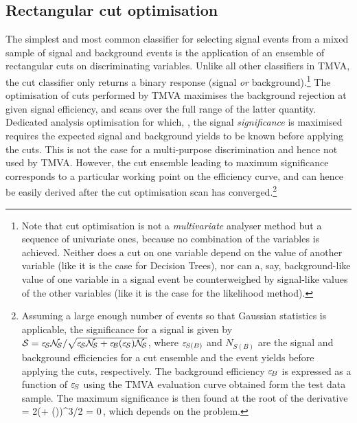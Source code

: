 \subsection{Rectangular cut optimisation}
\label{sec:cuts}

The simplest and most common classifier for selecting signal events from
a mixed sample of signal and background events is the application of an ensemble
of rectangular cuts on discriminating variables. Unlike 
all other classifiers in TMVA, the cut classifier only returns a binary 
response (signal {\em or} background).\footnote
{
   Note that cut optimisation is not a {\em multivariate} analyser 
   method but a sequence of univariate ones, because no combination of 
   the variables is achieved. Neither
   does a cut on one variable depend on the value of another variable
   (like it is the case for Decision Trees), nor can a, say, background-like
   value of one variable in a signal event be counterweighed by signal-like
   values of the other variables (like it is the case for the likelihood method).
}
The optimisation of cuts performed by TMVA maximises the background rejection
at given signal efficiency, and scans over the full range of the 
latter quantity. Dedicated analysis optimisation for which, \eg, the signal 
{\em significance} is maximised requires the expected signal and background
yields to be known before applying the cuts. This is not the case for a 
multi-purpose discrimination and hence not used by TMVA.
However, the cut ensemble leading to maximum significance corresponds to 
a particular working point on the efficiency curve, and can hence be easily
derived after the cut optimisation scan has converged.\footnote
{\label{ftn:cutcomp}
  Assuming a large enough number of events so that Gaussian statistics is applicable, the
  significance for a signal is given by $\Signif=\eS \NS/\sqrt{\eS \NS + \eB(\eS) \NS}$,
  where $\varepsilon_{\!S(B)}$ and $N_{\!S(B)}$ are the signal and background efficiencies for 
  a cut ensemble and the event yields before applying the cuts, respectively. 
  The background efficiency $ \varepsilon_{\!B}$
  is expressed as a function of $ \varepsilon_{\!S}$ using the TMVA evaluation curve obtained form 
  the test data sample. The maximum significance is then found at the root of the 
  derivative
  \beq
       = \NS{}
                 {2\left(\eS \NS + \eB(\eS)\NB\right)^{3/2}} = 0\,,
  \eeq
  which depends on the problem.
}

